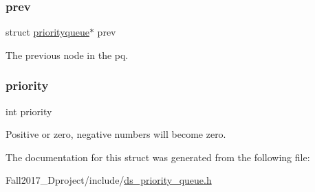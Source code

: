 \subsubsection{\texorpdfstring{prev}{prev}}
{\footnotesize\ttfamily struct \hyperlink{structpriorityqueue}{priorityqueue}$\ast$ prev}



The previous node in the pq. 

\mbox{\label{structpriorityqueue_acec9ce2df15222151ad66fcb1d74eb9f}} 
\subsubsection{\texorpdfstring{priority}{priority}}
{\footnotesize\ttfamily int priority}



Positive or zero, negative numbers will become zero. 



The documentation for this struct was generated from the following file\+:\begin{DoxyCompactItemize}
\item 
Fall2017\+\_\+Dproject/include/\hyperlink{ds__priority__queue_8h}{ds\+\_\+priority\+\_\+queue.\+h}\end{DoxyCompactItemize}
